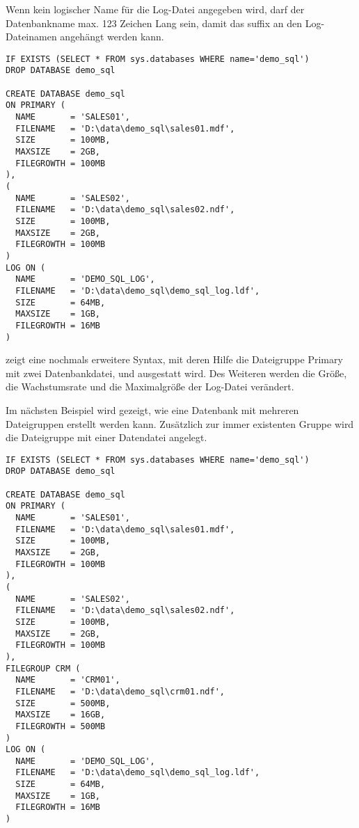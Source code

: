         \begin{merke}
          Wenn kein logischer Name f\"ur die Log-Datei angegeben wird, darf der
          Datenbankname max. 123 Zeichen Lang sein, damit das suffix
           an den Log-Dateinamen angehängt werden kann.
        \end{merke}
        \begin{lstlisting}[language=ms_sql,caption={Eine
        Dateigruppe mit mehreren Dateien ausstatten und die Log-Datei
        verändern},label=admin03_09]
IF EXISTS (SELECT * FROM sys.databases WHERE name='demo_sql')
DROP DATABASE demo_sql

CREATE DATABASE demo_sql
ON PRIMARY (
  NAME       = 'SALES01',
  FILENAME   = 'D:\data\demo_sql\sales01.mdf',
  SIZE       = 100MB,
  MAXSIZE    = 2GB,
  FILEGROWTH = 100MB
),
(
  NAME       = 'SALES02',
  FILENAME   = 'D:\data\demo_sql\sales02.ndf',
  SIZE       = 100MB,
  MAXSIZE    = 2GB,
  FILEGROWTH = 100MB
)
LOG ON (
  NAME       = 'DEMO_SQL_LOG',
  FILENAME   = 'D:\data\demo_sql\demo_sql_log.ldf',
  SIZE       = 64MB,
  MAXSIZE    = 1GB,
  FILEGROWTH = 16MB
)
      \end{lstlisting}
       zeigt eine nochmals erweitere Syntax, mit deren
      Hilfe die Dateigruppe Primary mit zwei Datenbankdatei,
       und  ausgestatt wird.
      Des Weiteren werden die Größe, die Wachstumsrate und die Maximalgröße der
      Log-Datei verändert.
      
      Im nächsten Beispiel wird gezeigt, wie eine Datenbank mit mehreren Dateigruppen
      erstellt werden kann. Zusätzlich zur immer existenten Gruppe
       wird die Dateigruppe  mit einer
      Datendatei angelegt.
\clearpage      
      \begin{lstlisting}[language=ms_sql,caption={Eine
        Dateigruppe mit mehreren Dateigruppen ausstatten und die Log-Datei
        verändern},label=admin03_10]
IF EXISTS (SELECT * FROM sys.databases WHERE name='demo_sql')
DROP DATABASE demo_sql

CREATE DATABASE demo_sql
ON PRIMARY (
  NAME       = 'SALES01',
  FILENAME   = 'D:\data\demo_sql\sales01.mdf',
  SIZE       = 100MB,
  MAXSIZE    = 2GB,
  FILEGROWTH = 100MB
),
(
  NAME       = 'SALES02',
  FILENAME   = 'D:\data\demo_sql\sales02.ndf',
  SIZE       = 100MB,
  MAXSIZE    = 2GB,
  FILEGROWTH = 100MB
),
FILEGROUP CRM (
  NAME       = 'CRM01',
  FILENAME   = 'D:\data\demo_sql\crm01.ndf',
  SIZE       = 500MB,
  MAXSIZE    = 16GB,
  FILEGROWTH = 500MB
)
LOG ON (
  NAME       = 'DEMO_SQL_LOG',
  FILENAME   = 'D:\data\demo_sql\demo_sql_log.ldf',
  SIZE       = 64MB,
  MAXSIZE    = 1GB,
  FILEGROWTH = 16MB
)
      \end{lstlisting}
      \begin{literaturinternet}
        \item \cite{ms176061}
      \end{literaturinternet}
